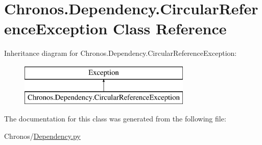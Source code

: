 \hypertarget{classChronos_1_1Dependency_1_1CircularReferenceException}{}\section{Chronos.\+Dependency.\+Circular\+Reference\+Exception Class Reference}
\label{classChronos_1_1Dependency_1_1CircularReferenceException}
Inheritance diagram for Chronos.\+Dependency.\+Circular\+Reference\+Exception\+:\begin{figure}[H]
\begin{center}
\leavevmode
\includegraphics[height=2.000000cm]{classChronos_1_1Dependency_1_1CircularReferenceException}
\end{center}
\end{figure}


The documentation for this class was generated from the following file\+:\begin{DoxyCompactItemize}
\item 
Chronos/\hyperlink{Dependency_8py}{Dependency.\+py}\end{DoxyCompactItemize}
